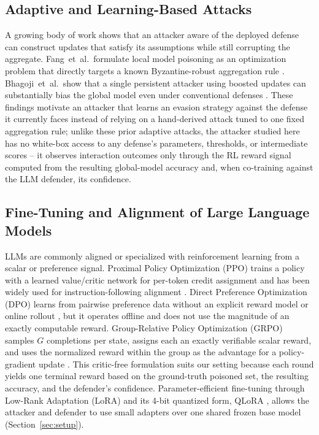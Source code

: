 \documentclass[conference]{IEEEtran}
\begin{document}
\subsection{Adaptive and Learning-Based Attacks}
A growing body of work shows that an attacker aware of the deployed defense can construct updates that satisfy its assumptions while still corrupting the aggregate. Fang~et~al.\ formulate local model poisoning as an optimization problem that directly targets a known Byzantine-robust aggregation rule \cite{fang2020}. Bhagoji~et~al.\ show that a single persistent attacker using boosted updates can substantially bias the global model even under conventional defenses \cite{bhagoji2019}. These findings motivate an attacker that learns an evasion strategy against the defense it currently faces instead of relying on a hand-derived attack tuned to one fixed aggregation rule; unlike these prior adaptive attacks, the attacker studied here has no white-box access to any defense's parameters, thresholds, or intermediate scores -- it observes interaction outcomes only through the RL reward signal computed from the resulting global-model accuracy and, when co-training against the LLM defender, its confidence.

\subsection{Fine-Tuning and Alignment of Large Language Models}
LLMs are commonly aligned or specialized with reinforcement learning from a scalar or preference signal. Proximal Policy Optimization (PPO) trains a policy with a learned value/critic network for per-token credit assignment and has been widely used for instruction-following alignment \cite{ppo,ouyang2022}. Direct Preference Optimization (DPO) learns from pairwise preference data without an explicit reward model or online rollout \cite{dpo}, but it operates offline and does not use the magnitude of an exactly computable reward. Group-Relative Policy Optimization (GRPO) samples $G$ completions per state, assigns each an exactly verifiable scalar reward, and uses the normalized reward within the group as the advantage for a policy-gradient update \cite{grpo}. This critic-free formulation suits our setting because each round yields one terminal reward based on the ground-truth poisoned set, the resulting accuracy, and the defender's confidence. Parameter-efficient fine-tuning through Low-Rank Adaptation (LoRA) \cite{lora2022} and its 4-bit quantized form, QLoRA \cite{qlora2023}, allows the attacker and defender to use small adapters over one shared frozen base model (Section~\ref{sec:setup}).
\end{document}
